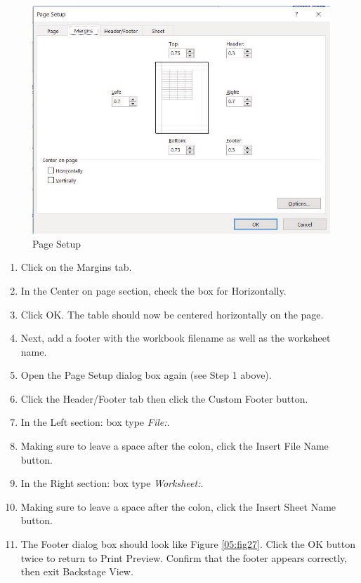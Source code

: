 \begin{figure}[H]
	\centering
	\includegraphics[width=\maxwidth{.95\linewidth}]{gfx/ch05_fig26}
	\caption{Page Setup}
	\label{05:fig26}
\end{figure}

\begin{enumerate}[resume]
	\item Click on the Margins tab.
	\item In the Center on page section, check the box for Horizontally.
	\item Click OK. The table should now be centered horizontally on the page.
	\item Next, add a footer with the workbook filename as well as the worksheet name.
	\item Open the Page Setup dialog box again (see Step 1 above).
	\item Click the Header/Footer tab then click the Custom Footer button.
	\item In the Left section: box type \textit{File:}.
	\item Making sure to leave a space after the colon, click the Insert File Name button.
	\item In the Right section: box type \textit{Worksheet:}.
	\item Making sure to leave a space after the colon, click the Insert Sheet Name button.
	\item The Footer dialog box should look like Figure \ref{05:fig27}. Click the OK button twice to return to Print Preview. Confirm that the footer appears correctly, then exit Backstage View.
\end{enumerate}

